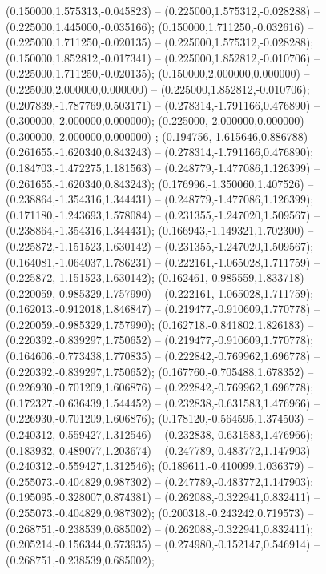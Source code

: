  (0.150000,1.575313,-0.045823) -- (0.225000,1.575312,-0.028288) -- (0.225000,1.445000,-0.035166);
 (0.150000,1.711250,-0.032616) -- (0.225000,1.711250,-0.020135) -- (0.225000,1.575312,-0.028288);
 (0.150000,1.852812,-0.017341) -- (0.225000,1.852812,-0.010706) -- (0.225000,1.711250,-0.020135);
 (0.150000,2.000000,0.000000) -- (0.225000,2.000000,0.000000) -- (0.225000,1.852812,-0.010706);
 (0.207839,-1.787769,0.503171) -- (0.278314,-1.791166,0.476890) -- (0.300000,-2.000000,0.000000);
 (0.225000,-2.000000,0.000000) -- (0.300000,-2.000000,0.000000) ;
 (0.194756,-1.615646,0.886788) -- (0.261655,-1.620340,0.843243) -- (0.278314,-1.791166,0.476890);
 (0.184703,-1.472275,1.181563) -- (0.248779,-1.477086,1.126399) -- (0.261655,-1.620340,0.843243);
 (0.176996,-1.350060,1.407526) -- (0.238864,-1.354316,1.344431) -- (0.248779,-1.477086,1.126399);
 (0.171180,-1.243693,1.578084) -- (0.231355,-1.247020,1.509567) -- (0.238864,-1.354316,1.344431);
 (0.166943,-1.149321,1.702300) -- (0.225872,-1.151523,1.630142) -- (0.231355,-1.247020,1.509567);
 (0.164081,-1.064037,1.786231) -- (0.222161,-1.065028,1.711759) -- (0.225872,-1.151523,1.630142);
 (0.162461,-0.985559,1.833718) -- (0.220059,-0.985329,1.757990) -- (0.222161,-1.065028,1.711759);
 (0.162013,-0.912018,1.846847) -- (0.219477,-0.910609,1.770778) -- (0.220059,-0.985329,1.757990);
 (0.162718,-0.841802,1.826183) -- (0.220392,-0.839297,1.750652) -- (0.219477,-0.910609,1.770778);
 (0.164606,-0.773438,1.770835) -- (0.222842,-0.769962,1.696778) -- (0.220392,-0.839297,1.750652);
 (0.167760,-0.705488,1.678352) -- (0.226930,-0.701209,1.606876) -- (0.222842,-0.769962,1.696778);
 (0.172327,-0.636439,1.544452) -- (0.232838,-0.631583,1.476966) -- (0.226930,-0.701209,1.606876);
 (0.178120,-0.564595,1.374503) -- (0.240312,-0.559427,1.312546) -- (0.232838,-0.631583,1.476966);
 (0.183932,-0.489077,1.203674) -- (0.247789,-0.483772,1.147903) -- (0.240312,-0.559427,1.312546);
 (0.189611,-0.410099,1.036379) -- (0.255073,-0.404829,0.987302) -- (0.247789,-0.483772,1.147903);
 (0.195095,-0.328007,0.874381) -- (0.262088,-0.322941,0.832411) -- (0.255073,-0.404829,0.987302);
 (0.200318,-0.243242,0.719573) -- (0.268751,-0.238539,0.685002) -- (0.262088,-0.322941,0.832411);
 (0.205214,-0.156344,0.573935) -- (0.274980,-0.152147,0.546914) -- (0.268751,-0.238539,0.685002);

